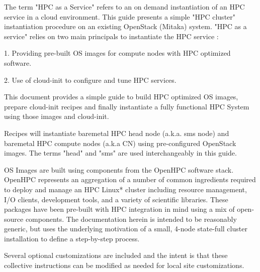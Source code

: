The term "HPC as a Service" refers to an on demand instantiation of an HPC service in a cloud environment. This guide presents a simple "HPC cluster" instantiation procedure on an existing OpenStack (Mitaka) system. "HPC as a service" relies on two main principals to instantiate the HPC service :


\begin{list}{}
	\item 	1. Providing pre-built OS images for compute nodes with HPC optimized software.
	\item   2. Use of cloud-init to configure and tune HPC services.
	 
\end{list}
	
This document provides a simple guide to build HPC optimized OS images, prepare cloud-init recipes and finally instantiate a fully functional HPC System using those images and cloud-init. 

Recipes will instantiate baremetal HPC head node (a.k.a. sms node) and baremetal HPC compute nodes (a.k.a CN) using pre-configured OpenStack images. The terms "head" and "sms" are used interchangeably in this guide.

OS Images are built using components from the OpenHPC software stack. OpenHPC represents an aggregation of a number of common ingredients required to deploy and manage an HPC Linux* cluster including resource management, I/O clients, development tools, and a variety of scientific libraries. These packages have been pre-built with HPC integration in mind using a mix of open-source components. The documentation herein is intended to be reasonably generic,
but uses the underlying motivation of a small, 4-node state-full cluster installation to define a step-by-step process. 

Several optional customizations are included and the intent is that these collective instructions can be modified as needed for local site customizations.

